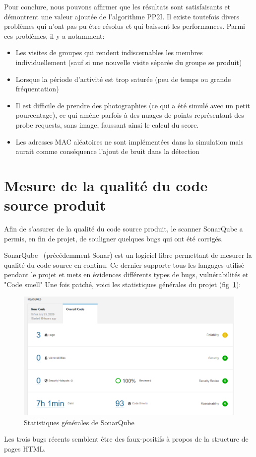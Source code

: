 Pour conclure, nous pouvons affirmer que les résultats sont satisfaisants et démontrent une valeur ajoutée de l'algorithme PP2I. 
Il existe toutefois divers problèmes qui n'ont pas pu être résolus et qui baissent les performances. Parmi ces problèmes, il y a notamment:
\begin{itemize}
    \item Les visites de groupes qui rendent indiscernables les membres individuellement (sauf si une nouvelle visite séparée du groupe se produit)
    \item Lorsque la période d'activité est trop saturée (peu de temps ou grande fréquentation)
    \item Il est difficile de prendre des photographies (ce qui a été simulé avec un petit pourcentage), ce qui amène parfois à des nuages de points représentant des probe requests, sans image, faussant ainsi le calcul du score.
    \item Les adresses MAC aléatoires ne sont implémentées dans la simulation mais aurait comme conséquence l'ajout de bruit dans la détection 
\end{itemize}

\section{Mesure de la qualité du code source produit}

Afin de s'assurer de la qualité du code source produit, le scanner SonarQube a permis, en fin de projet, de souligner quelques bugs qui ont été corrigés.

SonarQube~\cite{wiki:sonar} (précédemment Sonar) est un logiciel libre permettant de mesurer la qualité du code source en continu. Ce dernier supporte tous les langages utilisé pendant
le projet et mets en évidences différents types de bugs, vulnérabilités et "Code smell"  
Une fois patché, voici les statistiques générales du projet (fig~\ref{fig:sonar_stats}):

\begin{figure}[H]
	\centering
	\includegraphics[width=12cm]{images/tests/stats_sonarqube.png}
	\caption{Statistiques générales de SonarQube}
	\label{fig:sonar_stats}
\end{figure}

Les trois bugs récents semblent être des faux-positifs à propos de la structure de pages HTML.